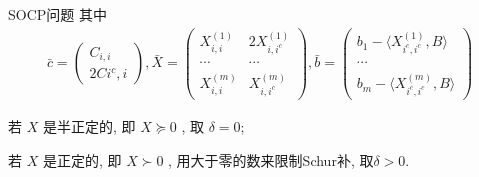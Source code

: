 \documentclass[slidestop,compress,mathserif,UTF8]{beamer}
\numberwithin{equation}{section}                                %
\begin{document}
            \begin{frame}[t]{SOCP问题}
                其中
                \begin{equation}
                    \begin{split}\label{SOCPCondition}
                            \bar{c}
                        =	\begin{pmatrix} C_{i, i} \\ 2C{i^c, i} \end{pmatrix},
                            \bar{X}
                        =	\begin{pmatrix}
                                X^(1)_{i, i} & 2X^(1)_{i, i^c} \\
                                \cdots & \cdots \\
                                X^(m)_{i, i} & X^(m)_{i, i^c}
                            \end{pmatrix},
                            \bar{b}
                        =	\begin{pmatrix}
                                b_1 - \langle{X^(1)_{i^c, i^c}, B}\rangle \\
                                \cdots \\
                                b_m - \langle{X^(m)_{i^c, i^c}, B}\rangle 
                            \end{pmatrix}
                    \end{split}
                \end{equation}
                
                若 $X$ 是半正定的, 即 $X \succeq 0$ , 取 $\delta = 0$; 
                
                若 $X$ 是正定的, 即 $X \succ 0$ , 用大于零的数来限制Schur补, 取$\delta > 0$.
            \end{frame}
\end{document}
